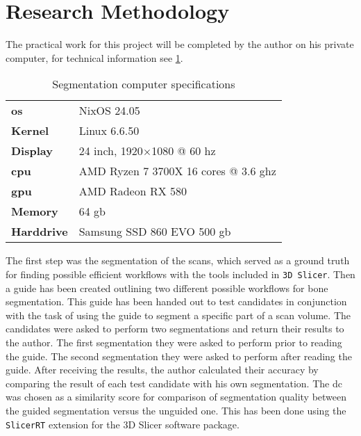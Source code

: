 \section{Research Methodology}\label{s:introduction-researchmethodology}
The practical work for this project will be completed by the author on his private computer, for technical information see \cref{t:computer-specs}.
\begin{table}[ht]
	\centering
		\begin{tabular}{l l}
			\textbf{\acrshort{os}}  & NixOS 24.05                   \\
			\textbf{Kernel}         & Linux 6.6.50                                   \\
			\textbf{Display}        & 24 inch, 1920$\times$1080 @ 60 \acrshort{hz}           \\
			\textbf{\acrshort{cpu}} & AMD Ryzen 7 3700X 16 cores @ 3.6 \acrshort{ghz} \\
			\textbf{\acrshort{gpu}} & AMD Radeon RX 580                              \\
			\textbf{Memory}         & 64 \acrshort{gb}                               \\
			\textbf{Harddrive}      & Samsung SSD 860 EVO 500 \acrshort{gb}
		\end{tabular}
	\caption{Segmentation computer specifications}\label{t:computer-specs}
\end{table}

\noindent
The first step was the segmentation of the \mct\space scans, which served as a ground truth for finding possible efficient workflows with the tools included in \texttt{3D Slicer}.
Then a guide has been created outlining two different possible workflows for bone segmentation.
This guide has been handed out to test candidates in conjunction with the task of using the guide to segment a specific part of a scan volume.
The candidates were asked to perform two segmentations and return their results to the author.
The first segmentation they were asked to perform prior to reading the guide.
The second segmentation they were asked to perform after reading the guide.
After receiving the results, the author calculated their accuracy by comparing the result of each test candidate with his own segmentation.
The \acrfull{dc} \cite{diceMeasuresAmountEcologic1945} was chosen as a similarity score for comparison of segmentation quality between the guided segmentation versus the unguided one.
This has been done using the \texttt{SlicerRT} \cite{pinterSlicerRTRadiationTherapy2012} extension for the 3D Slicer software package.

